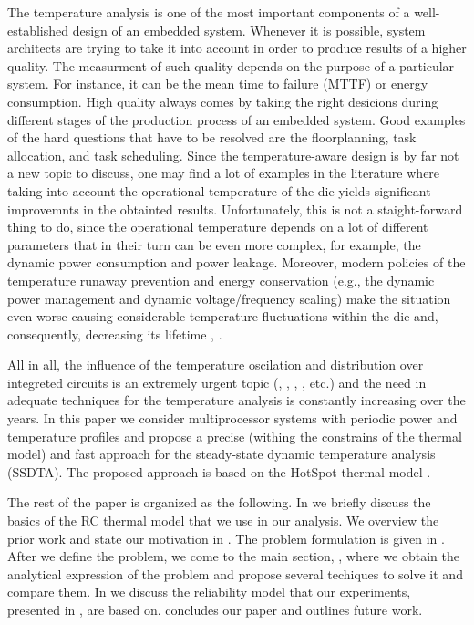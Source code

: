The temperature analysis is one of the most important components of a well-established design of an embedded system. Whenever it is possible, system architects are trying to take it into account in order to produce results of a higher quality. The measurment of such quality depends on the purpose of a particular system. For instance, it can be the mean time to failure (MTTF) or energy consumption. High quality always comes by taking the right desicions during different stages of the production process of an embedded system. Good examples of the hard questions that have to be resolved are the floorplanning, task allocation, and task scheduling. Since the temperature-aware design is by far not a new topic to discuss, one may find a lot of examples in the literature where taking into account the operational temperature of the die yields significant improvemnts in the obtainted results. Unfortunately, this is not a staight-forward thing to do, since the operational temperature depends on a lot of different parameters that in their turn can be even more complex, for example, the dynamic power consumption and power leakage. Moreover, modern policies of the temperature runaway prevention and energy conservation (e.g., the dynamic power management and dynamic voltage/frequency scaling) make the situation even worse causing considerable temperature fluctuations within the die and, consequently, decreasing its lifetime \cite{mihic2004}, \cite{simunic2005}.

All in all, the influence of the temperature oscilation and distribution over integreted circuits is an extremely urgent topic (\cite{hieu2004}, \cite{lu2004}, \cite{jedec2010}, \cite{xiang2010}, etc.) and the need in adequate techniques for the temperature analysis is constantly increasing over the years. In this paper we consider multiprocessor systems with periodic power and temperature profiles and propose a precise (withing the constrains of the thermal model) and fast approach for the steady-state dynamic temperature analysis (SSDTA). The proposed approach is based on the HotSpot thermal model \cite{huang2006}.

The rest of the paper is organized as the following. In  we briefly discuss the basics of the RC thermal model that we use in our analysis. We overview the prior work and state our motivation in . The problem formulation is given in . After we define the problem, we come to the main section, , where we obtain the analytical expression of the problem and propose several techiques to solve it and compare them. In  we discuss the reliability model that our experiments, presented in , are based on.  concludes our paper and outlines future work.
